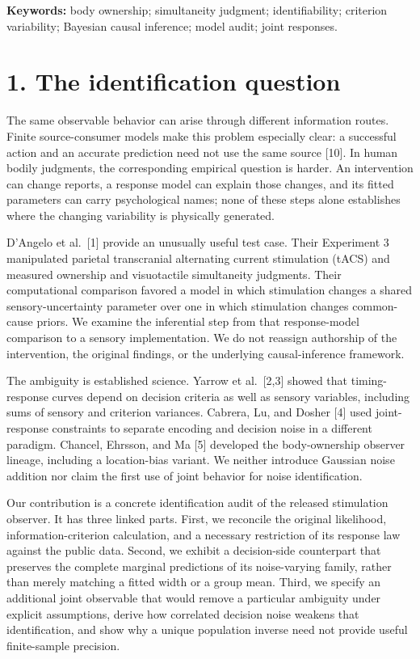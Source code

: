 \documentclass[
  11pt,
]{article}
\let\ctdoldsection\section
\renewcommand{\section}{\Needspace{8\baselineskip}\ctdoldsection}
\begin{document}
\textbf{Keywords:} body ownership; simultaneity judgment;
identifiability; criterion variability; Bayesian causal inference; model
audit; joint responses.

\hypertarget{the-identification-question}{%
\section{1. The identification
question}\label{the-identification-question}}

The same observable behavior can arise through different information
routes. Finite source-consumer models make this problem especially
clear: a successful action and an accurate prediction need not use the
same source {[}10{]}. In human bodily judgments, the corresponding
empirical question is harder. An intervention can change reports, a
response model can explain those changes, and its fitted parameters can
carry psychological names; none of these steps alone establishes where
the changing variability is physically generated.

D'Angelo et al.~{[}1{]} provide an unusually useful test case. Their
Experiment 3 manipulated parietal transcranial alternating current
stimulation (tACS) and measured ownership and visuotactile simultaneity
judgments. Their computational comparison favored a model in which
stimulation changes a shared sensory-uncertainty parameter over one in
which stimulation changes common-cause priors. We examine the
inferential step from that response-model comparison to a sensory
implementation. We do not reassign authorship of the intervention, the
original findings, or the underlying causal-inference framework.

The ambiguity is established science. Yarrow et al.~{[}2,3{]} showed
that timing-response curves depend on decision criteria as well as
sensory variables, including sums of sensory and criterion variances.
Cabrera, Lu, and Dosher {[}4{]} used joint-response constraints to
separate encoding and decision noise in a different paradigm. Chancel,
Ehrsson, and Ma {[}5{]} developed the body-ownership observer lineage,
including a location-bias variant. We neither introduce Gaussian noise
addition nor claim the first use of joint behavior for noise
identification.

Our contribution is a concrete identification audit of the released
stimulation observer. It has three linked parts. First, we reconcile the
original likelihood, information-criterion calculation, and a necessary
restriction of its response law against the public data. Second, we
exhibit a decision-side counterpart that preserves the complete marginal
predictions of its noise-varying family, rather than merely matching a
fitted width or a group mean. Third, we specify an additional joint
observable that would remove a particular ambiguity under explicit
assumptions, derive how correlated decision noise weakens that
identification, and show why a unique population inverse need not
provide useful finite-sample precision.
\end{document}
